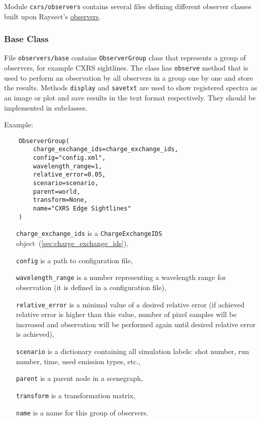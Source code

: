 \documentclass[../../main]{subfiles}
\begin{document}
Module \texttt{cxrs/observers} contains several files defining different observer classes built upon Raysect's \href{https://raysect.github.io/documentation/api_reference/optical/observers.html?highlight=observer}{observers}.

\subsubsection{Base Class}%
\label{sec:observers_base}

File \texttt{observers/base} contains \texttt{ObserverGroup} class that represents a group of observers, for example CXRS sightlines. The class has \texttt{observe} method that is used to perform an observation by all observers in a group one by one and store the results. Methods \texttt{display} and \texttt{savetxt} are used to show registered spectra as an image or plot and save results in the text format respectively. They should be implemented in subclasses.

Example:
\begin{verbatim}
    ObserverGroup(
        charge_exchange_ids=charge_exchange_ids,
        config="config.xml",
        wavelength_range=1,
        relative_error=0.05,
        scenario=scenario,
        parent=world,
        transform=None,
        name="CXRS Edge Sightlines"
    )
\end{verbatim}

\begin{itemize}[align=left]
    \item[\texttt{charge\_exchange\_ids}] is a \texttt{ChargeExchangeIDS} object~(\cref{sec:charge_exchange_ids}),
    \item[\texttt{config}] is a path to configuration file,
    \item[\texttt{wavelength\_range}] is a number representing a wavelength range for observation (it is defined in a configuration file),
    \item[\texttt{relative\_error}] is a minimal value of a desired relative error (if achieved relative error is higher than this value, number of pixel samples will be increased and observation will be performed again until desired relative error is achieved),
    \item[\texttt{scenario}] is a dictionary containing all simulation labels: shot number, run number, time, used emission types, etc.,
    \item[\texttt{parent}] is a parent node in a scenegraph,
    \item[\texttt{transform}] is a transformation matrix,
    \item[\texttt{name}] is a name for this group of observers.
\end{itemize}
\end{document}
